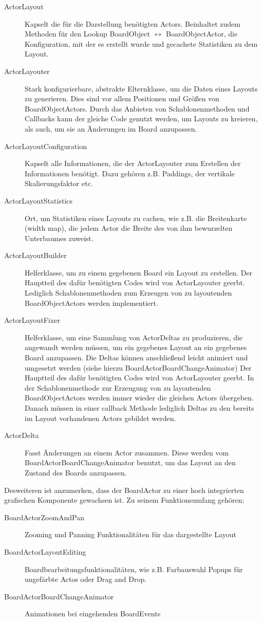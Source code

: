 \begin{description}
\item[ActorLayout]
	Kapselt die für die Darstellung benötigten Actors. 
	Beinhaltet zudem Methoden für den Lookup BoardObject $\leftrightarrow$ BoardObjectActor, die Konfiguration, mit der es erstellt wurde und gecachete Statistiken zu dem Layout.
\item[ActorLayouter]
	Stark konfigurierbare, abstrakte Elternklasse, um die Daten eines Layouts zu generieren.
	Dies sind vor allem Positionen und Größen von BoardObjectActors.
	Durch das Anbieten von Schablonenmethoden und Callbacks kann der gleiche Code genutzt werden, um Layouts zu kreieren, als auch, um sie an Änderungen im Board anzupassen.
\item[ActorLayoutConfiguration]
	Kapselt alle Informationen, die der ActorLayouter zum Erstellen der Informationen benötigt. Dazu gehören z.B. Paddings, der vertikale Skalierungsfaktor etc.
\item[ActorLayoutStatistics]
	Ort, um Statistiken eines Layouts zu cachen, wie z.B. die Breitenkarte (width map), die jedem Actor die Breite des von ihm bewurzelten Unterbaumes zuweist.
\item[ActorLayoutBuilder]
	Helferklasse, um zu einem gegebenen Board ein Layout zu erstellen.
	Der Hauptteil des dafür benötigten Codes wird von ActorLayouter geerbt.
	Lediglich Schablonenmethoden zum Erzeugen von zu layoutenden BoardObjectActors werden implementiert.
\item[ActorLayoutFixer]
	Helferklasse, um eine Sammlung von ActorDeltas zu produzieren, die angewandt werden müssen, um ein gegebenes Layout an ein gegebenes Board anzupassen.
	Die Deltas können anschließend leicht animiert und umgesetzt werden (siehe hierzu BoardActorBoardChangeAnimator)
	Der Hauptteil des dafür benötigten Codes wird von ActorLayouter geerbt.
	In der Schablonenmethode zur Erzeugung von zu layoutenden BoardObjectActors werden immer wieder die gleichen Actors übergeben.
	Danach müssen in einer callback Methode lediglich Deltas zu den bereits im Layout vorhandenen Actors gebildet werden.
\item[ActorDelta]
	Fasst Änderungen an einem Actor zusammen.
	Diese werden vom BoardActorBoardChangeAnimator benutzt, um das Layout an den Zustand des Boards anzupassen.
\end{description}

Desweiteren ist anzumerken, dass der BoardActor zu einer hoch integrierten grafischen Komponente gewachsen ist.
Zu seinem Funktionsumfang gehören:
\begin{description}
\item[BoardActorZoomAndPan] Zooming und Panning Funktionalitäten für das dargestellte Layout
\item[BoardActorLayoutEditing] Boardbearbeitungsfunktionalitäten, wie z.B. Farbauswahl Popups für ungefärbte Actos oder Drag and Drop.
\item[BoardActorBoardChangeAnimator] Animationen bei eingehenden BoardEvents
\end{description}


